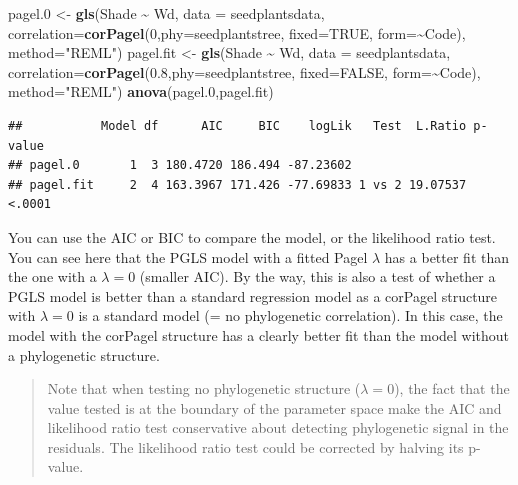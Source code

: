 \documentclass[
]{book}
\newenvironment{Shaded}{\begin{snugshade}}{\end{snugshade}}
\newcommand{\AttributeTok}[1]{\textcolor[rgb]{0.13,0.29,0.53}{#1}}
\newcommand{\ConstantTok}[1]{\textcolor[rgb]{0.56,0.35,0.01}{#1}}
\newcommand{\DecValTok}[1]{\textcolor[rgb]{0.00,0.00,0.81}{#1}}
\newcommand{\FloatTok}[1]{\textcolor[rgb]{0.00,0.00,0.81}{#1}}
\newcommand{\FunctionTok}[1]{\textcolor[rgb]{0.13,0.29,0.53}{\textbf{#1}}}
\newcommand{\NormalTok}[1]{#1}
\newcommand{\OtherTok}[1]{\textcolor[rgb]{0.56,0.35,0.01}{#1}}
\newcommand{\SpecialCharTok}[1]{\textcolor[rgb]{0.81,0.36,0.00}{\textbf{#1}}}
\newcommand{\StringTok}[1]{\textcolor[rgb]{0.31,0.60,0.02}{#1}}
\begin{document}
\begin{Shaded}
\begin{Highlighting}[]
\NormalTok{pagel}\FloatTok{.0} \OtherTok{\textless{}{-}} \FunctionTok{gls}\NormalTok{(Shade }\SpecialCharTok{\textasciitilde{}}\NormalTok{ Wd, }\AttributeTok{data =}\NormalTok{ seedplantsdata, }
               \AttributeTok{correlation=}\FunctionTok{corPagel}\NormalTok{(}\DecValTok{0}\NormalTok{,}\AttributeTok{phy=}\NormalTok{seedplantstree, }
                                    \AttributeTok{fixed=}\ConstantTok{TRUE}\NormalTok{, }\AttributeTok{form=}\SpecialCharTok{\textasciitilde{}}\NormalTok{Code), }
               \AttributeTok{method=}\StringTok{"REML"}\NormalTok{)}
\NormalTok{pagel.fit }\OtherTok{\textless{}{-}} \FunctionTok{gls}\NormalTok{(Shade }\SpecialCharTok{\textasciitilde{}}\NormalTok{ Wd, }\AttributeTok{data =}\NormalTok{ seedplantsdata, }
                 \AttributeTok{correlation=}\FunctionTok{corPagel}\NormalTok{(}\FloatTok{0.8}\NormalTok{,}\AttributeTok{phy=}\NormalTok{seedplantstree, }
                                      \AttributeTok{fixed=}\ConstantTok{FALSE}\NormalTok{, }\AttributeTok{form=}\SpecialCharTok{\textasciitilde{}}\NormalTok{Code),}
                 \AttributeTok{method=}\StringTok{"REML"}\NormalTok{)}
\FunctionTok{anova}\NormalTok{(pagel}\FloatTok{.0}\NormalTok{,pagel.fit)}
\end{Highlighting}
\end{Shaded}

\begin{verbatim}
##           Model df      AIC     BIC    logLik   Test  L.Ratio p-value
## pagel.0       1  3 180.4720 186.494 -87.23602                        
## pagel.fit     2  4 163.3967 171.426 -77.69833 1 vs 2 19.07537  <.0001
\end{verbatim}

You can use the AIC or BIC to compare the model, or the likelihood ratio test. You can see here that the PGLS model with a fitted Pagel \(\lambda\) has a better fit than the one with a \(\lambda=0\) (smaller AIC). By the way, this is also a test of whether a PGLS model is better than a standard regression model as a corPagel structure with \(\lambda=0\) is a standard model (= no phylogenetic correlation). In this case, the model with the corPagel structure has a clearly better fit than the model without a phylogenetic structure.

\begin{quote}
Note that when testing no phylogenetic structure (\(\lambda=0\)), the fact that the value tested is at the boundary of the parameter space make the AIC and likelihood ratio test conservative about detecting phylogenetic signal in the residuals. The likelihood ratio test could be corrected by halving its p-value.
\end{quote}
\end{document}

